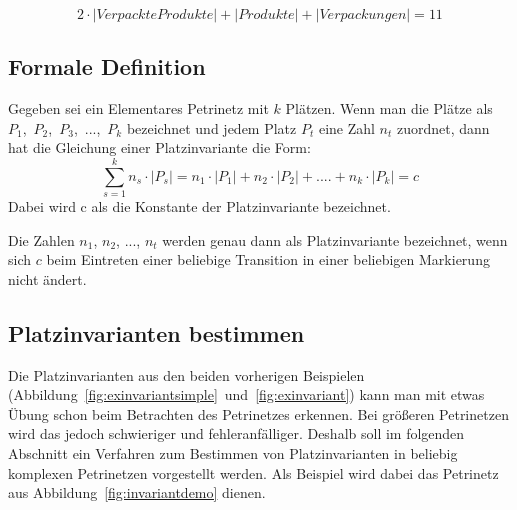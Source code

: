 		$$2\cdot|Verpackte Produkte| + |Produkte| + |Verpackungen| = 11$$

	\subsection{Formale Definition}
	\label{sub:formale_definition}
		Gegeben sei ein Elementares Petrinetz mit $k$ Plätzen. Wenn man die Plätze als $P_1$,~$P_2$,~$P_3$,~...,~$P_k$ bezeichnet und jedem Platz $P_t$ eine Zahl $n_t$ zuordnet, dann hat die Gleichung einer Platzinvariante die Form:
		$$
		\sum_{s=1}^k n_s \cdot |P_s| = n_1 \cdot |P_1| + n_2 \cdot |P_2| + .... + n_k \cdot |P_k| = c
		$$
		Dabei wird c als die Konstante der Platzinvariante bezeichnet. 

		Die Zahlen $n_1$, $n_2$, ..., $n_t$ werden genau dann als Platzinvariante bezeichnet, wenn sich $c$ beim Eintreten einer beliebige Transition in einer beliebigen Markierung nicht ändert.

	\subsection{Platzinvarianten bestimmen}
	\label{sub:platzinvarianten_bestimmen}
		Die Platzinvarianten aus den beiden vorherigen Beispielen (Abbildung~\ref{fig:exinvariantsimple}~und~\ref{fig:exinvariant}) kann man mit etwas Übung schon beim Betrachten des Petrinetzes erkennen. Bei größeren Petrinetzen wird das jedoch schwieriger und fehleranfälliger. Deshalb soll im folgenden Abschnitt ein Verfahren zum Bestimmen von Platzinvarianten in beliebig komplexen Petrinetzen vorgestellt werden. Als Beispiel wird dabei das Petrinetz aus Abbildung~\ref{fig:invariantdemo} dienen.

